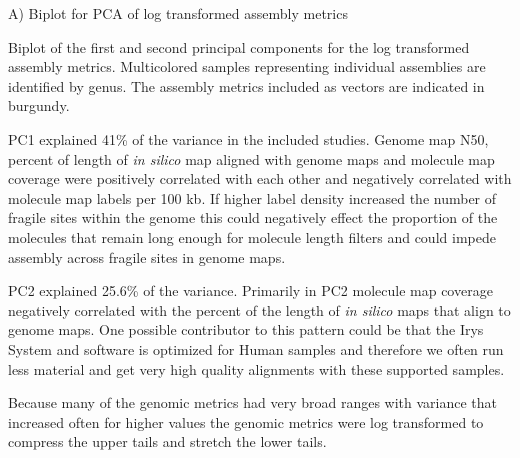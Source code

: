       A) Biplot for PCA of log transformed assembly metrics

Biplot of the first and second principal components for the log transformed assembly metrics. Multicolored samples representing individual assemblies are identified by genus. The assembly metrics included as vectors are indicated in burgundy. 

PC1 explained 41\% of the variance in the included studies. Genome map N50, percent of length of \textit{in silico} map aligned with genome maps and molecule map coverage were positively  correlated with each other and negatively correlated with molecule map labels per 100 kb. If higher label density increased the number of fragile sites within the genome this could  negatively effect the proportion of the molecules that remain long enough for molecule length filters and could impede assembly across fragile sites in genome maps. 

PC2 explained 25.6\% of the variance. Primarily in PC2 molecule map coverage negatively correlated with the percent of the length of \textit{in silico} maps that align to genome maps. One possible contributor to this pattern could be that the Irys System and software is optimized for Human samples and therefore we often run less material and get very high quality alignments with these supported samples.

Because many of the genomic metrics had very broad ranges with variance that increased often for higher values the genomic metrics were log transformed to compress the upper tails and stretch the lower tails.
